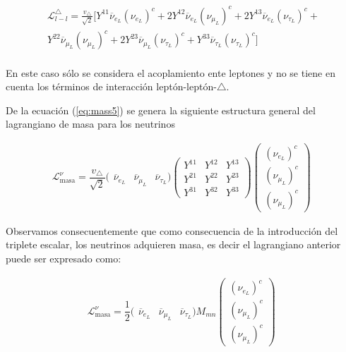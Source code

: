 \documentclass[12pt]{article}
\begin{document}
\begin{equation}
    \label{eq:mass5}
\begin{aligned}
\mathcal{L}^\triangle_{l-l}= \frac{v_\triangle}{\sqrt2} [Y^{11}\overline{\nu}_{e_L}({\nu}_{e_L})^c + 2Y^{12}\overline{\nu}_{e_L}({\nu}_{\mu_L})^c+ 2Y^{13}\overline{\nu}_{e_L}({\nu}_{\tau_L})^c+ \\
Y^{22}\overline{\nu}_{\mu_L}({\nu}_{\mu_L})^c + 2Y^{23}\overline{\nu}_{\mu_L}({\nu}_{\tau_L})^c+ Y^{33}\overline{\nu}_{\tau_L}({\nu}_{\tau_L})^c
]
\end{aligned}
\end{equation} \\

En este caso sólo se considera el acoplamiento ente leptones y no se tiene en cuenta los términos de interacción leptón-leptón-$\triangle$. 

De la ecuación (\ref{eq:mass5}) se genera la siguiente estructura general del lagrangiano de masa para los neutrinos

\begin{equation*}
    \mathcal{L}^\nu_{\text{masa}}= \frac{v_\triangle}{\sqrt{2}} (\begin{array}{ccc}
         \overline{\nu}_{e_L} & \overline{\nu}_{\mu_L} & \overline{\nu}_{\tau_L} )\begin{pmatrix}    Y^{11} &  Y^{12} & Y^{13} \\
         Y^{21} &  Y^{22} & Y^{23}  \\
         Y^{31} &  Y^{32} & Y^{33}  \end{pmatrix}
  \begin{pmatrix}
         (\nu_{e_L})^c \\
         (\nu_{\mu_L})^c \\
         (\nu_{\mu_L})^c 
    \end{pmatrix}
    \end{array}
    \label{eq:mass1}
\end{equation*} 

Observamos consecuentemente que como consecuencia de la introducción del triplete escalar, los neutrinos adquieren masa, es decir el lagrangiano anterior puede ser expresado como:  

\begin{equation}
    \mathcal{L}^\nu_{\text{masa}}= \frac{1}{2} (\begin{array}{ccc}
         \overline{\nu}_{e_L} & \overline{\nu}_{\mu_L} & \overline{\nu}_{\tau_L} )M_{mn}    \begin{pmatrix}
         (\nu_{e_L})^c \\
         (\nu_{\mu_L})^c \\
         (\nu_{\mu_L})^c 
    \end{pmatrix}
    \end{array}
    \label{eq:mss2}
\end{equation} 
\end{document}
